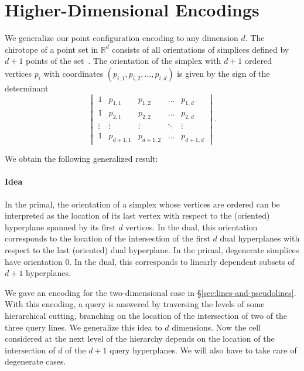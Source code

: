 \section{Higher-Dimensional Encodings}%
\label{sec:hyperplanes}

We generalize our point configuration encoding to any dimension \(d\). The
chirotope of a point set in \(\mathbb{R}^d\) consists of all orientations of
simplices defined by \(d+1\) points of the set~\cite{RZ04}.
The orientation of the simplex with \(d+1\) ordered vertices \(p_i\) with
coordinates \((p_{i,1} , p_{i,2} , \ldots, p_{i,d} )\) is given by the sign of
the determinant
%
\begin{displaymath}
  \begin{vmatrix}
    1 & p_{1,1} & p_{1,2} & \hdots & p_{1,d} \\
    1 & p_{2,1} & p_{2,2} & \hdots & p_{2,d} \\
    \vdots & \vdots & \vdots & \ddots & \vdots \\
    1 & p_{d+1,1} & p_{d+1,2} & \hdots & p_{d+1,d}
  \end{vmatrix}.
\end{displaymath}

We obtain the following generalized result:
%
\restate{\TheoremGPTRealizableD*}
\restate{\TheoremGPTPreprocessingD*}

\paragraph*{Idea}

In the primal, the orientation of a simplex whose vertices are ordered can be
interpreted as the location of its last vertex with respect to the (oriented)
hyperplane spanned by its first \(d\) vertices. In the dual, this orientation
corresponds to the location of the intersection of the first \(d\) dual
hyperplanes with respect to the last (oriented) dual hyperplane.
%
\ifjournal%
  In the primal, degenerate simplices have orientation \(0\). In the dual, this
  corresponds to linearly dependent subsets of \(d+1\) hyperplanes.
\fi%

We gave an encoding for the two-dimensional case in \S\ref{sec:lines-and-pseudolines}.
With this encoding, a query is answered by traversing the levels of
some hierarchical cutting, branching on the location of the intersection of two
of the three query lines. We generalize this idea to \(d\) dimensions. Now the
cell considered at the next level of the hierarchy depends on the location
of the intersection of \(d\) of the \(d+1\) query hyperplanes.
\ifjournal%
  We will also have to take care of degenerate cases.
\fi%

